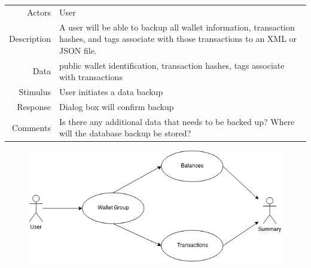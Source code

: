 \begin{table}[H]
  \tabulinesep=1.2mm
      \begin{tabu}{r | X}
        \rowfont{\color{black}}
        \\
        \hline
        \textsf{Actors} & User\\
        Description & A user will be able to backup all wallet information, transaction hashes, and tags associate with those transactions to an XML or JSON file.\\
        Data & public wallet identification, transaction hashes, tags associate with transactions\\
        Stimulus & User initiates a data backup\\
        Response & Dialog box will confirm backup\\
        Comments & Is there any additional data that needs to be backed up? Where will the database backup be stored?\\
      \end{tabu}
    \end{table}

	
    \begin{figure}[ht]
      \includegraphics[width=1.0\textwidth]{./section7/diagrams/usecase_3_6.png}
    \end{figure}

